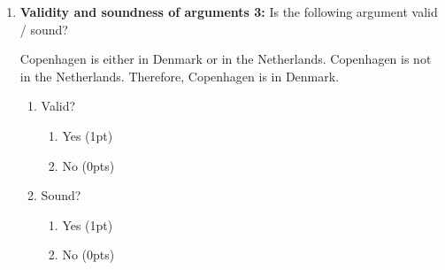 \documentclass[a4,11pt]{article}
\begin{document}
\begin{enumerate}[leftmargin = 12pt]
\begin{exe}
\ex
\begin{xlist}
 + 2 = 4.
\ex Therefore, Paris is in Europe.
\end{xlist}
\end{exe}
 \begin{enumerate}[noitemsep]
    \item Valid? 
            \begin{enumerate}[noitemsep]
       \item Yes (0pts) 
       \item No (1pt)
         \end{enumerate}
    \item Sound? 
                \begin{enumerate}[noitemsep]
       \item Yes (0pts) 
       \item No (1pt)
                \end{enumerate}
\end{enumerate}

{\bf Model answer:} The correct answer is not valid and not sound. The argument is not valid because its premise (sentences a) does not entail the conclusion (sentence b). We can prove that by applying the defeasibility diagnostic: {\em 2+2 = 4 and Paris is not in Europe} is not a contradiction. While the premise of the argument is true (2 + 2 is, in fact, 4), the argument is not sound. It is not sound because an argument can only be sound if meets two criteria: its premises are true and the argument is valid.

\item {\bf Validity and soundness of arguments 3:} Is the following argument valid / sound?
\begin{exe}
\ex
\begin{xlist}
\ex Copenhagen is either in Denmark or in the Netherlands.
\ex Copenhagen is not in the Netherlands.
\ex Therefore, Copenhagen is in Denmark.
\end{xlist}
\end{exe}
 \begin{enumerate}[noitemsep]
    \item Valid? 
            \begin{enumerate}[noitemsep]
       \item Yes (1pt) 
       \item No (0pts)
         \end{enumerate}
    \item Sound? 
                \begin{enumerate}[noitemsep]
       \item Yes (1pt) 
       \item No (0pts)
                \end{enumerate}
\end{enumerate}


\end{enumerate}
\end{document}
